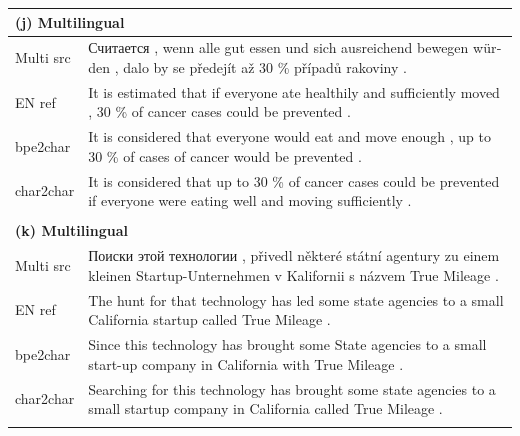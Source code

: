 \documentclass[11pt,letterpaper]{article}
\newcommand{\tb}{\textbf}
\newcommand{\clr}{\color{Red}}
\newcommand{\clg}{\color{ForestGreen}}
\newcommand{\cly}{\color{YellowOrange}}
\newcommand{\clb}{\color{Cerulean}}
\begin{document}
\begin{table}[t]
\footnotesize
\centering
\begin{tabular}{p{1.4cm}|p{14.6cm}}

\multicolumn{2}{l}{\tb{(j) Multilingual}} \\ \hline \hline
Multi src  & \vspace{-0.85em} {\clb\foreignlanguage{russian}{Считается}} , {\clg\foreignlanguage{german}{wenn alle gut essen und sich ausreichend bewegen würden}} , {\cly\foreignlanguage{czech}{dalo by se předejít až 30 \% případů rakoviny }} .\\ \hline
EN ref  & It is estimated that {\clr if everyone ate healthily and sufficiently moved }, 30 \% of cancer cases could be prevented . \\ \hline
bpe2char &  It is considered that {\clr everyone would eat and move enough }, up to 30 \% of cases of cancer would be prevented . \\ \hline
char2char & It is considered that up to 30 \% of cancer cases could be prevented {\clr if everyone were eating well and moving sufficiently }. \\ \hline
\multicolumn{2}{l}{} \\

\multicolumn{2}{l}{\tb{(k) Multilingual}} \\ \hline \hline
Multi src  & \vspace{-0.85em} {\clb\foreignlanguage{russian}{Поиски этой технологии}} , {\cly\foreignlanguage{czech}{přivedl některé státní agentury}} {\clg\foreignlanguage{german}{zu einem kleinen Startup-Unternehmen}} {\cly\foreignlanguage{czech}{v Kalifornii s názvem True Mileage }}. \\ \hline
EN ref  & \vspace{-0.85em} {\clr The hunt for that technology} has led some state agencies to a small California startup called True Mileage . \\ \hline
bpe2char &  \vspace{-0.85em} {\clr Since this technology} has brought some State agencies to a small start-up company in California with True Mileage . \\ \hline
char2char & \vspace{-0.85em} {\clr Searching for this technology} has brought some state agencies to a small startup company in California called True Mileage . \\ \hline
\multicolumn{2}{l}{}        \\


\end{tabular}
\end{table}
\end{document}
